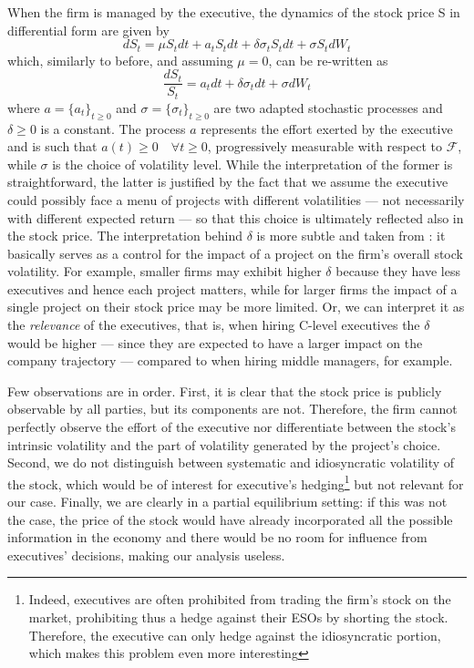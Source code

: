 When the firm is managed by the executive, the dynamics of the stock price S in differential form are given by 
$$ dS_t = \mu S_t dt + a_t S_t dt + \delta \sigma_t S_t dt + \sigma S_t dW_t $$
which, similarly to before, and assuming $\mu = 0$, can be re-written as 
$$ \frac{dS_t}{S_t} = a_t dt + \delta \sigma_t dt + \sigma dW_t $$
where $a = \{a_t\}_{t \ge 0}$ and $\sigma = \{\sigma_t\}_{t \ge 0}$ are two adapted stochastic processes and $\delta \ge 0$ is a constant. The process $a$ represents the effort exerted by the executive and is such that $a(t) \ge 0 \quad \forall t \ge 0$, progressively measurable with respect to $\mathscr{F}$, while $\sigma$ is the choice of volatility level. While the interpretation of the former is straightforward, the latter is justified by the fact that we assume the executive could possibly face a menu of projects with different volatilities --- not necessarily with different expected return --- so that this choice is ultimately reflected also in the stock price. 
The interpretation behind $\delta$ is more subtle and taken from \cite{cadenillas2005executive}: it basically serves as a control for the impact of a project on the firm's overall stock volatility. For example, smaller firms may exhibit higher $\delta$ because they have less executives and hence each project matters, while for larger firms the impact of a single project on their stock price may be more limited. Or, we can interpret it as the \textit{relevance} of the executives, that is, when hiring C-level executives the $\delta$ would be higher --- since they are expected to have a larger impact on the company trajectory --- compared to when hiring middle managers, for example.

Few observations are in order. First, it is clear that the stock price is publicly observable by all parties, but its components are not. Therefore, the firm cannot perfectly observe the effort of the executive nor differentiate between the stock's intrinsic volatility and the part of volatility generated by the project's choice. Second, we do not distinguish between systematic and idiosyncratic volatility of the stock, which would be of interest for executive's hedging\footnote{Indeed, executives are often prohibited from trading the firm's stock on the market, prohibiting thus a hedge against their ESOs by shorting the stock. Therefore, the executive can only hedge against the idiosyncratic portion, which makes this problem even more interesting} but not relevant for our case. Finally, we are clearly in a partial equilibrium setting: if this was not the case, the price of the stock would have already incorporated all the possible information in the economy and there would be no room for influence from executives' decisions, making our analysis useless.


